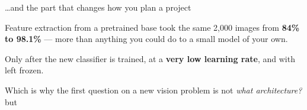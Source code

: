 \documentclass[aspectratio=169,11pt,t]{beamer}
\begin{document}
\begin{frame}{\ldots{}and the part that changes how you plan a project}
\begin{minipage}[t]{0.494\textwidth}
\begin{icardgood}
Feature extraction from a pretrained base took the same 2,000 images from \textbf{84\% to 98.1\%} --- more than anything you could do to a small model of your own.
\end{icardgood}
\end{minipage}%
\hfill
\begin{minipage}[t]{0.494\textwidth}
\begin{icardaccent}
Only after the new classifier is trained, at a \textbf{very low learning rate}, and with  left frozen.
\end{icardaccent}
\end{minipage}%
\begin{iband}[signal]
Which is why the first question on a new vision problem is not \textit{what architecture?} but 
\end{iband}
\vskip 4pt
\vskip 2pt
\end{frame}
\end{document}
